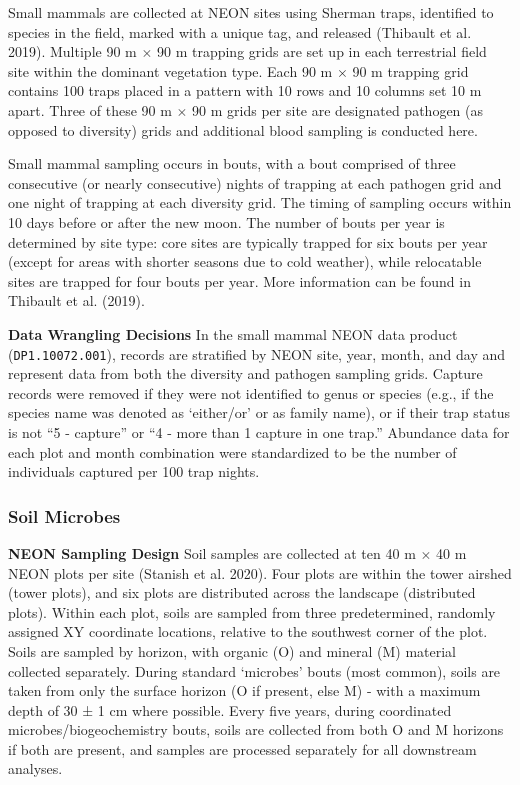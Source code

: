 \documentclass[
  12pt,
]{article}
\begin{document}
Small mammals are collected at NEON sites using Sherman traps, identified to species in the field, marked with a unique tag, and released (Thibault et al. 2019). Multiple 90 m \(\times\) 90 m trapping grids are set up in each terrestrial field site within the dominant vegetation type. Each 90 m \(\times\) 90 m trapping grid contains 100 traps placed in a pattern with 10 rows and 10 columns set 10 m apart. Three of these 90 m \(\times\) 90 m grids per site are designated pathogen (as opposed to diversity) grids and additional blood sampling is conducted here.

Small mammal sampling occurs in bouts, with a bout comprised of three consecutive (or nearly consecutive) nights of trapping at each pathogen grid and one night of trapping at each diversity grid. The timing of sampling occurs within 10 days before or after the new moon. The number of bouts per year is determined by site type: core sites are typically trapped for six bouts per year (except for areas with shorter seasons due to cold weather), while relocatable sites are trapped for four bouts per year. More information can be found in Thibault et al. (2019).

\textbf{Data Wrangling Decisions} In the small mammal NEON data product (\texttt{DP1.10072.001}), records are stratified by NEON site, year, month, and day and represent data from both the diversity and pathogen sampling grids. Capture records were removed if they were not identified to genus or species (e.g., if the species name was denoted as `either/or' or as family name), or if their trap status is not ``5 - capture'' or ``4 - more than 1 capture in one trap.'' Abundance data for each plot and month combination were standardized to be the number of individuals captured per 100 trap nights.

\hypertarget{soil-microbes}{%
\subsubsection{Soil Microbes}\label{soil-microbes}}

\textbf{NEON Sampling Design} Soil samples are collected at ten 40 m \(\times\) 40 m NEON plots per site (Stanish et al. 2020). Four plots are within the tower airshed (tower plots), and six plots are distributed across the landscape (distributed plots). Within each plot, soils are sampled from three predetermined, randomly assigned XY coordinate locations, relative to the southwest corner of the plot. Soils are sampled by horizon, with organic (O) and mineral (M) material collected separately. During standard `microbes' bouts (most common), soils are taken from only the surface horizon (O if present, else M) - with a maximum depth of 30 ± 1 cm where possible. Every five years, during coordinated microbes/biogeochemistry bouts, soils are collected from both O and M horizons if both are present, and samples are processed separately for all downstream analyses.
\end{document}
